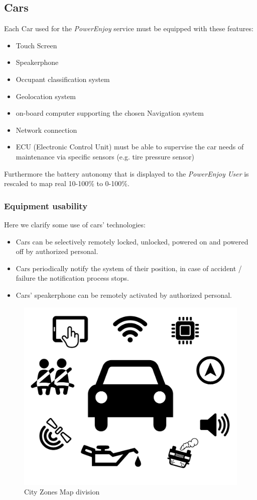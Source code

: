 \documentclass[english]{article}
\newcommand{\powerenjoy}{\textit{PowerEnjoy }}
\newcommand{\powerenjoyuser}{\textit{PowerEnjoy User }}
\begin{document}
\subsection{Cars}
	Each Car used for the \powerenjoy service must be equipped with these features:
	\begin{itemize}
		\item Touch Screen
		\item Speakerphone
		\item Occupant classification system
		\item Geolocation system
		\item on-board computer supporting the chosen Navigation system
		\item Network connection
		\item ECU (Electronic Control Unit) must be able to supervise the car needs of maintenance via specific sensors (e.g. tire pressure sensor)
		\end{itemize}
	Furthermore the battery autonomy that is displayed to the \powerenjoyuser is rescaled to map real 10-100\% to 0-100\%.
	\subsubsection{Equipment usability}
	Here we clarify some use of cars' technologies:
	\begin{itemize}
		\item Cars can be selectively remotely locked, unlocked, powered on and powered off by authorized personal.
		\item Cars periodically notify the system of their position, in case of accident / failure the notification process stops.
		\item Cars' speakerphone can be remotely activated by authorized personal.
	\end{itemize}
	\begin{figure}[H]
\centering
\includegraphics[scale=0.1]{auto.pdf}%

\caption{City Zones Map division}
\end{figure}
\end{document}
